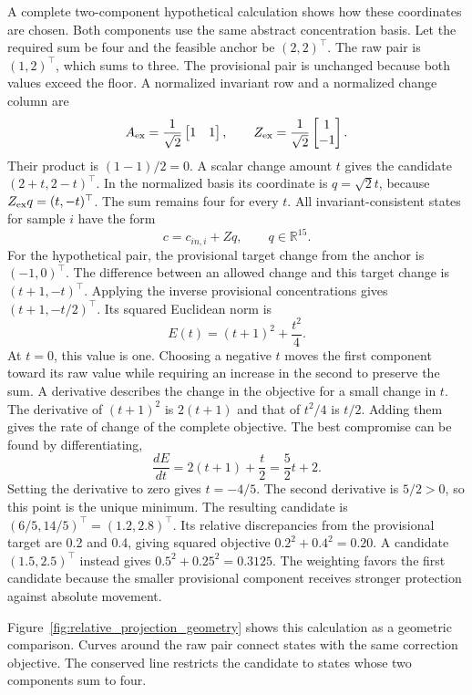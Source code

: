A complete two-component hypothetical calculation shows how these coordinates are chosen. Both components use the same abstract concentration basis. Let the required sum be four and the feasible anchor be $(2,2)^\top$. The raw pair is $(1,2)^\top$, which sums to three. The provisional pair is unchanged because both values exceed the floor. A normalized invariant row and a normalized change column are
\[
A_{\rm ex}=\frac1{\sqrt2}\begin{bmatrix}1&1\end{bmatrix},\qquad
Z_{\rm ex}=\frac1{\sqrt2}\begin{bmatrix}1\\-1\end{bmatrix}.
\]
Their product is $(1-1)/2=0$. A scalar change amount $t$ gives the candidate $(2+t,2-t)^\top$. In the normalized basis its coordinate is $q=\sqrt2t$, because $Z_{\rm ex}q=(t,-t)^\top$. The sum remains four for every $t$. All invariant-consistent states for sample $i$ have the form
\begin{equation}
c=c_{in,i}+Zq,\qquad q\in\mathbb{R}^{15}.
\label{eq:projection_affine_parameterization}
\end{equation}
For the hypothetical pair, the provisional target change from the anchor is $(-1,0)^\top$. The difference between an allowed change and this target change is $(t+1,-t)^\top$. Applying the inverse provisional concentrations gives $(t+1,-t/2)^\top$. Its squared Euclidean norm is
\[
E(t)=(t+1)^2+\frac{t^2}{4}.
\]
At $t=0$, this value is one. Choosing a negative $t$ moves the first component toward its raw value while requiring an increase in the second to preserve the sum. A derivative describes the change in the objective for a small change in $t$. The derivative of $(t+1)^2$ is $2(t+1)$ and that of $t^2/4$ is $t/2$. Adding them gives the rate of change of the complete objective. The best compromise can be found by differentiating,
\[
\frac{dE}{dt}=2(t+1)+\frac t2=\frac52t+2.
\]
Setting the derivative to zero gives $t=-4/5$. The second derivative is $5/2>0$, so this point is the unique minimum. The resulting candidate is $(6/5,14/5)^\top=(1.2,2.8)^\top$. Its relative discrepancies from the provisional target are 0.2 and 0.4, giving squared objective $0.2^2+0.4^2=0.20$. A candidate $(1.5,2.5)^\top$ instead gives $0.5^2+0.25^2=0.3125$. The weighting favors the first candidate because the smaller provisional component receives stronger protection against absolute movement.

Figure~\ref{fig:relative_projection_geometry} shows this calculation as a geometric comparison. Curves around the raw pair connect states with the same correction objective. The conserved line restricts the candidate to states whose two components sum to four.

